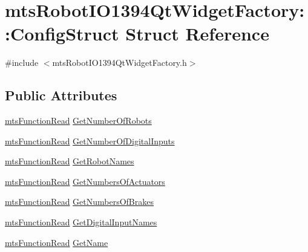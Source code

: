 \hypertarget{structmts_robot_i_o1394_qt_widget_factory_1_1_config_struct}{}\section{mts\+Robot\+I\+O1394\+Qt\+Widget\+Factory\+:\+:Config\+Struct Struct Reference}
\label{structmts_robot_i_o1394_qt_widget_factory_1_1_config_struct}


{\ttfamily \#include $<$mts\+Robot\+I\+O1394\+Qt\+Widget\+Factory.\+h$>$}

\subsection*{Public Attributes}
\begin{DoxyCompactItemize}
\item 
\hyperlink{classmts_function_read}{mts\+Function\+Read} \hyperlink{structmts_robot_i_o1394_qt_widget_factory_1_1_config_struct_ad1307767b157207b98c7c168b722bfd3}{Get\+Number\+Of\+Robots}
\item 
\hyperlink{classmts_function_read}{mts\+Function\+Read} \hyperlink{structmts_robot_i_o1394_qt_widget_factory_1_1_config_struct_aa3d7624988a88f0de7f89216c77ff640}{Get\+Number\+Of\+Digital\+Inputs}
\item 
\hyperlink{classmts_function_read}{mts\+Function\+Read} \hyperlink{structmts_robot_i_o1394_qt_widget_factory_1_1_config_struct_a23dacd0bac2b78c3189369f05574f678}{Get\+Robot\+Names}
\item 
\hyperlink{classmts_function_read}{mts\+Function\+Read} \hyperlink{structmts_robot_i_o1394_qt_widget_factory_1_1_config_struct_ac42845bab8a99564d514ce80bbd75115}{Get\+Numbers\+Of\+Actuators}
\item 
\hyperlink{classmts_function_read}{mts\+Function\+Read} \hyperlink{structmts_robot_i_o1394_qt_widget_factory_1_1_config_struct_af94d75bc59d42e56fc3111524dfa2352}{Get\+Numbers\+Of\+Brakes}
\item 
\hyperlink{classmts_function_read}{mts\+Function\+Read} \hyperlink{structmts_robot_i_o1394_qt_widget_factory_1_1_config_struct_ae26b7957cc23fdba6892db0f94df95b1}{Get\+Digital\+Input\+Names}
\item 
\hyperlink{classmts_function_read}{mts\+Function\+Read} \hyperlink{structmts_robot_i_o1394_qt_widget_factory_1_1_config_struct_a8afb68d3670baa53512623e46d07e1af}{Get\+Name}
\end{DoxyCompactItemize}


